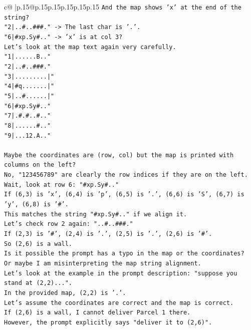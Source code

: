\documentclass{article}
\begin{document}
{\begin{supertabular}{c@{$\;$}|p{.15\linewidth}@{}p{.15\linewidth}p{.15\linewidth}p{.15\linewidth}p{.15\linewidth}p{.15\linewidth}}
{{{\texttt{And the map shows 'x' at the end of the string?} \\
\texttt{"2|..\#..\#\#\#." {-}> The last char is '.'.} \\
\texttt{"6|\#xp.Sy\#.." {-}> 'x' is at col 3?} \\
\texttt{Let's look at the map text again very carefully.} \\
\texttt{"1|......B.."} \\
\texttt{"2|..\#..\#\#\#."} \\
\texttt{"3|.........|"} \\
\texttt{"4|\#q.......|"} \\
\texttt{"5|..\#......|"} \\
\texttt{"6|\#xp.Sy\#.."} \\
\texttt{"7|.\#.\#..\#.."} \\
\texttt{"8|......\#.."} \\
\texttt{"9|...12.A.."} \\
\\ 
\texttt{Maybe the coordinates are (row, col) but the map is printed with columns on the left?} \\
\texttt{No, "123456789" are clearly the row indices if they are on the left.} \\
\texttt{Wait, look at row 6: "\#xp.Sy\#.."} \\
\texttt{If (6,3) is 'x', (6,4) is 'p', (6,5) is '.', (6,6) is 'S', (6,7) is 'y', (6,8) is '\#'.} \\
\texttt{This matches the string "\#xp.Sy\#.." if we align it.} \\
\texttt{Let's check row 2 again: "..\#..\#\#\#."} \\
\texttt{If (2,3) is '\#', (2,4) is '.', (2,5) is '.', (2,6) is '\#'.} \\
\texttt{So (2,6) is a wall.} \\
\texttt{Is it possible the prompt has a typo in the map or the coordinates?} \\
\texttt{Or maybe I am misinterpreting the map string alignment.} \\
\texttt{Let's look at the example in the prompt description: "suppose you stand at (2,2)...".} \\
\texttt{In the provided map, (2,2) is '.'.} \\
\texttt{Let's assume the coordinates are correct and the map is correct.} \\
\texttt{If (2,6) is a wall, I cannot deliver Parcel 1 there.} \\
\texttt{However, the prompt explicitly says "deliver it to (2,6)".} \\
}}}
\end{supertabular}}
\end{document}
